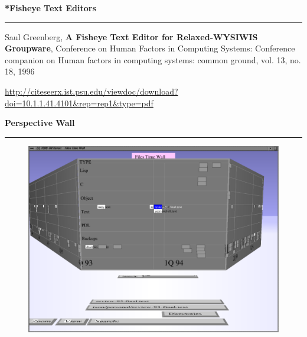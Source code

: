 \documentclass[pdf]{beamer}
\begin{document}
\begin{frame}
{\textbf{*Fisheye Text Editors}}{\textcolor{red}{\rule{12cm}{1.2pt}}}

Saul Greenberg, \textbf{A Fisheye Text Editor for Relaxed-WYSIWIS Groupware}, Conference on Human Factors in Computing Systems: Conference companion on Human factors in computing systems: common ground, vol. 13, no. 18, 1996
\newline
    
\url{http://citeseerx.ist.psu.edu/viewdoc/download?doi=10.1.1.41.4101&rep=rep1&type=pdf}
\end{frame}




\begin{frame}
{\textbf{Perspective Wall}}{\textcolor{red}{\rule{12cm}{1.2pt}}}

\begin{figure}
\includegraphics[scale=0.45]{39_Picture1.png}
\end{figure}

\end{frame}
\end{document}
